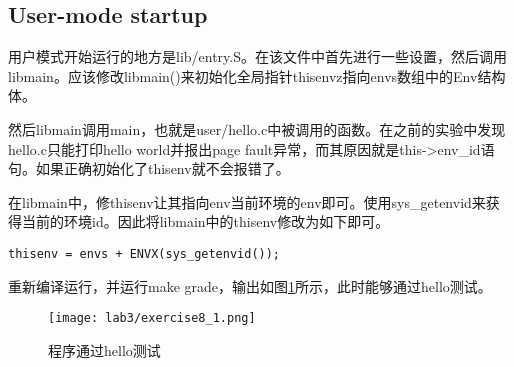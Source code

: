 \subsection{User-mode startup}
\par 用户模式开始运行的地方是lib/entry.S。在该文件中首先进行一些设置，然后调用libmain。应该修改libmain()来初始化全局指针thisenvz指向envs数组中的Env结构体。
\par 然后libmain调用main，也就是user/hello.c中被调用的函数。在之前的实验中发现hello.c只能打印hello world并报出page fault异常，而其原因就是this->env\_id语句。如果正确初始化了thisenv就不会报错了。
\begin{exerciseSolution}{8}
    \par 在libmain中，修thisenv让其指向env当前环境的env即可。使用sys\_getenvid来获得当前的环境id。因此将libmain中的thisenv修改为如下即可。
    \begin{lstlisting}
thisenv = envs + ENVX(sys_getenvid());
    \end{lstlisting}
    \par 重新编译运行，并运行make grade，输出如图\ref{fig:lab3/exercise8_1}所示，此时能够通过hello测试。
    \begin{figure}[htb]
        \centering
        \texttt{[image: lab3/exercise8\_1.png]}
        \caption{程序通过hello测试}
        \label{fig:lab3/exercise8_1}
    \end{figure}
\end{exerciseSolution}

